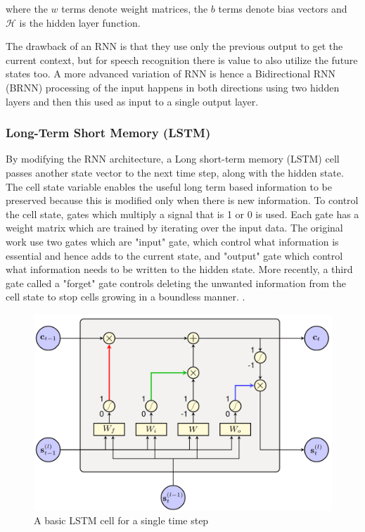 where the $w$ terms denote weight matrices, the $b$ terms denote bias vectors and $\mathcal{H}$ is the hidden layer function. \cite{Graves2013SpeechNetworks}

The drawback of an RNN is that they use only the previous output to get the current context, but for speech recognition there is value to also utilize the future states too. A more advanced variation of RNN is hence a Bidirectional RNN (BRNN) \cite{Schuster1997BidirectionalNetworks} processing of the input happens in both directions using two hidden layers and then this used as input to a single output layer. 

\subsubsection{Long-Term Short Memory (LSTM)}
By modifying the RNN architecture, a Long short-term memory (LSTM) cell \cite{Hochreiter1997LongMemory} passes another state vector to the next time step, along with the hidden state. The cell state variable enables the useful long term based information to be preserved because this is modified only when there is new information. To control the cell state, gates which multiply a signal that is 1 or 0 is used. Each gate has a weight matrix which are trained by iterating over the input data. The original work use two gates which are "input" gate, which control what information is essential and hence adds to the current state, and "output" gate which control what information needs to be written to the hidden state. More recently, a third gate called a "forget" gate controls deleting the unwanted information  from the cell state to stop cells growing in a boundless manner. \cite{Gers2000LearningLSTM}.

\begin{figure}[ht]
  \begin{center}
    \includegraphics[width=\textwidth]{images/lstm.png} 
    \caption{A basic LSTM cell for a single time step \cite{Enarvi2018ModelingRecognition}}
    \label{fig:lstm}
  \end{center}
\end{figure}

